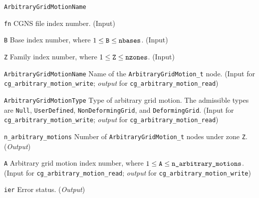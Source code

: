 \begin{Ventryi}{\texttt{ArbitraryGridMotionName}}\raggedright
\item [\texttt{fn}]
      CGNS file index number.
      (\textcolor{input}{Input})
\item [\texttt{B}]
      Base index number, where $1 \leq \text{\texttt{B}} \leq \text{\texttt{nbases}}$.
      (\textcolor{input}{Input})
\item [\texttt{Z}]
      Family index number, where $1 \leq \text{\texttt{Z}} \leq \text{\texttt{nzones}}$.
      (\textcolor{input}{Input})
\item [\texttt{ArbitraryGridMotionName}]
      Name of the \texttt{ArbitraryGridMotion\_t} node.
      (\textcolor{input}{Input} for \texttt{cg\_arbitrary\_motion\_write};
      \textcolor{output}{\textit{output}} for \texttt{cg\_arbitrary\_motion\_read})
\item [\texttt{ArbitraryGridMotionType}]
      Type of arbitrary grid motion.
      The admissible types are \texttt{Null}, \texttt{UserDefined},
      \texttt{NonDeformingGrid}, and \texttt{DeformingGrid}.
      (\textcolor{input}{Input} for \texttt{cg\_arbitrary\_motion\_write};
      \textcolor{output}{\textit{output}} for \texttt{cg\_arbitrary\_motion\_read})
\item [\texttt{n\_arbitrary\_motions}]
      Number of \texttt{ArbitraryGridMotion\_t} nodes under zone \texttt{Z}.
      (\textcolor{output}{\textit{Output}})
\item [\texttt{A}]
      Arbitrary grid motion index number, where $1 \leq \text{\texttt{A}} \leq \text{\texttt{n\_arbitrary\_motions}}$.
      (\textcolor{input}{Input} for \texttt{cg\_arbitrary\_motion\_read};
      \textcolor{output}{\textit{output}} for \texttt{cg\_arbitrary\_motion\_write})
\item [\texttt{ier}]
      Error status.
      (\textcolor{output}{\textit{Output}})
\end{Ventryi}
